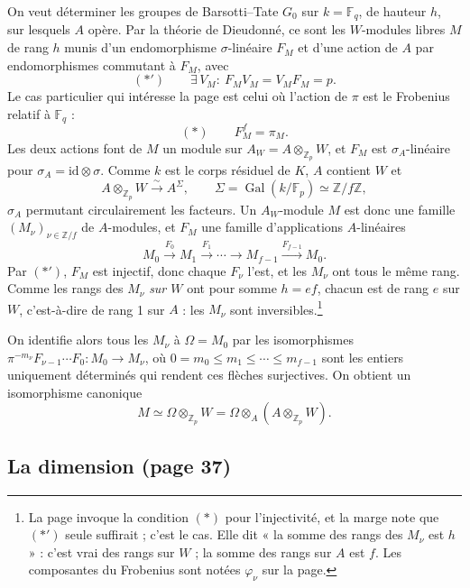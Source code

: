\documentclass[11pt,a4paper]{article}
\begin{document}
On veut déterminer les groupes de Barsotti--Tate $G_{0}$ sur $k =
\mathbb{F}_{q}$, de hauteur $h$, sur lesquels $A$ opère. Par la théorie de
Dieudonné, ce sont les $W$-modules libres $M$ de rang $h$ munis d'un
endomorphisme $\sigma$-linéaire $F_{M}$ et d'une action de $A$ par
endomorphismes commutant à $F_{M}$, avec
\[
(*') \qquad \exists\, V_{M} : \ F_{M}V_{M} = V_{M}F_{M} = p .
\]
Le cas particulier qui intéresse la page est celui où l'action de $\pi$ est
le Frobenius relatif à $\mathbb{F}_{q}$ :
\[
(*) \qquad F_{M}^{f} = \pi_{M} .
\]
Les deux actions font de $M$ un module sur $A_{W} = A \otimes_{\mathbb{Z}_{p}}
W$, et $F_{M}$ est $\sigma_{A}$-linéaire pour $\sigma_{A} = \mathrm{id}
\otimes \sigma$. Comme $k$ est le corps résiduel de $K$, $A$ contient $W$
et
\[
A \otimes_{\mathbb{Z}_{p}} W \xrightarrow{\ \sim\ } A^{\Sigma}, \qquad
\Sigma = \operatorname{Gal}(k/\mathbb{F}_{p}) \simeq \mathbb{Z}/f\mathbb{Z},
\]
$\sigma_{A}$ permutant circulairement les facteurs. Un $A_{W}$-module $M$ est
donc une famille $(M_{\nu})_{\nu \in \mathbb{Z}/f}$ de $A$-modules, et
$F_{M}$ une famille d'applications $A$-linéaires
\[
M_{0} \xrightarrow{F_{0}} M_{1} \xrightarrow{F_{1}} \cdots \to M_{f-1}
\xrightarrow{F_{f-1}} M_{0} .
\]
Par $(*')$, $F_{M}$ est injectif, donc chaque $F_{\nu}$ l'est, et les
$M_{\nu}$ ont tous le même rang. Comme les rangs des $M_{\nu}$ \emph{sur
$W$} ont pour somme $h = ef$, chacun est de rang $e$ sur $W$, c'est-à-dire de
rang 1 sur $A$ : les $M_{\nu}$ sont inversibles.\footnote{La page invoque la
condition $(*)$ pour l'injectivité, et la marge note que $(*')$ seule
suffirait ; c'est le cas. Elle dit « la somme des rangs des $M_{\nu}$ est
$h$ » : c'est vrai des rangs sur $W$ ; la somme des rangs sur $A$ est $f$.
Les composantes du Frobenius sont notées $\varphi_{\nu}$ sur la page.}

On identifie alors tous les $M_{\nu}$ à $\Omega = M_{0}$ par les
isomorphismes $\pi^{-m_{\nu}} F_{\nu-1}\cdots F_{0}\colon M_{0} \to M_{\nu}$,
où $0 = m_{0} \le m_{1} \le \cdots \le m_{f-1}$ sont les entiers uniquement
déterminés qui rendent ces flèches surjectives. On obtient un isomorphisme
canonique
\[
M \simeq \Omega \otimes_{\mathbb{Z}_{p}} W = \Omega \otimes_{A}
(A \otimes_{\mathbb{Z}_{p}} W).
\]

\subsection*{La dimension (page 37)}
\end{document}
